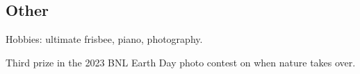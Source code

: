 \documentclass{article}
\renewenvironment{itemize}{
\begin{list}{}{
\setlength{\leftmargin}{.5em}}}{
\end{list}}
\begin{document}
\subsection*{Other}
\begin{itemize}
\item Hobbies: ultimate frisbee, piano, photography.
\item Third prize in the 2023 BNL Earth Day photo contest on when nature takes over.
\end{itemize}
\end{document}
